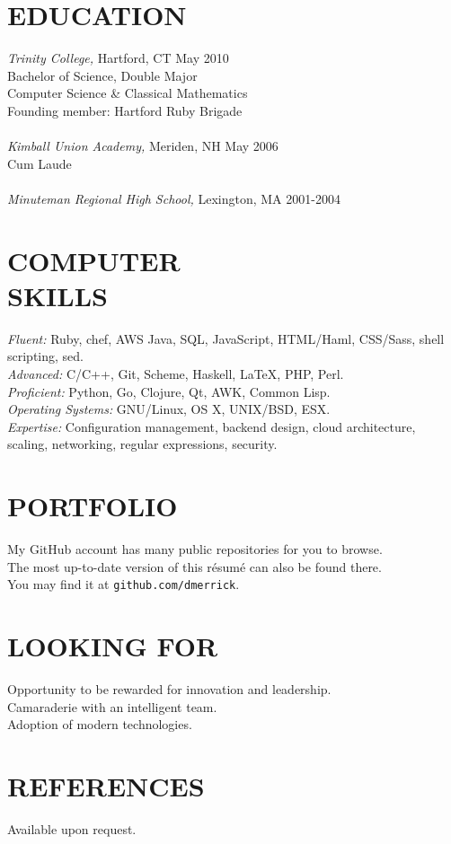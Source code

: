 \documentclass[line,margin]{res}
\begin{document}
\begin{resume}
\section{EDUCATION}
  {\sl Trinity College,}
  Hartford, CT \hfill May 2010 \\
  Bachelor of Science, Double Major \\
  Computer Science \& Classical Mathematics \\
  Founding member: Hartford Ruby Brigade \\
  \\
  {\sl Kimball Union Academy,}
  Meriden, NH \hfill May 2006 \\
  Cum Laude \\
  \\
  {\sl Minuteman Regional High School,}
  Lexington, MA \hfill 2001-2004

\section{COMPUTER \\ SKILLS}
  {\sl Fluent:}
  Ruby,
  chef,
  AWS
  Java,
  SQL,
  JavaScript,
  HTML/Haml,
  CSS/Sass,
  shell scripting,
  sed.
  \\
  {\sl Advanced:}
  C/C++,
  Git,
  Scheme,
  Haskell,
  \LaTeX,
  PHP,
  Perl.
  \\
  {\sl Proficient:}
  Python,
  Go,
  Clojure,
  Qt,
  AWK,
  Common Lisp.
  \\
  {\sl Operating Systems:}
  GNU/Linux, OS X, UNIX/BSD, ESX.
  \\
  {\sl Expertise:}
  Configuration management,
  backend design,
  cloud architecture,
  scaling,
  networking,
  regular expressions,
  security.

\section{PORTFOLIO}
  My GitHub account has many public repositories for you to browse. \\
  The most up-to-date version of this r\'{e}sum\'{e} can also be found there. \\
  You may find it at \texttt{github.com/dmerrick}.

\section{LOOKING FOR}
  Opportunity to be rewarded for innovation and leadership. \\
  Camaraderie with an intelligent team. \\
  Adoption of modern technologies.

\section{REFERENCES}
  Available upon request.

\end{resume}
\end{document}
